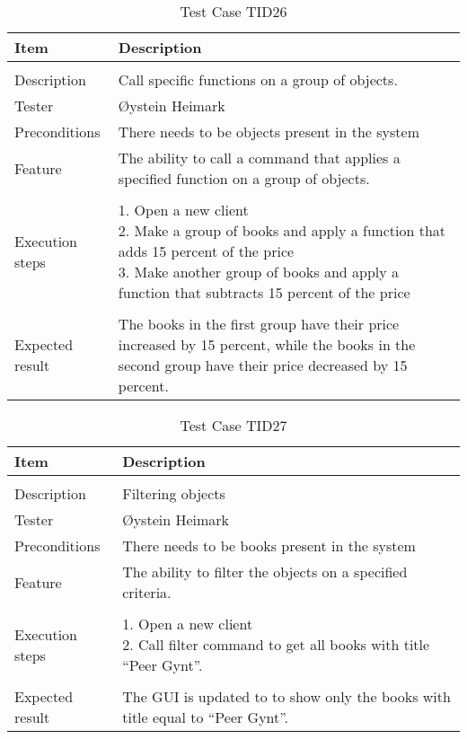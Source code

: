 \begin{table}[H]
\caption{Test Case TID26}
\centering
\begin{tabular}{ l p{13cm} }
\hline
 Item            & Description        \\
\hline \\ [-2.0ex]
 Description     &Call specific functions on a group of objects. \\
 Tester          & Øystein Heimark                  \\
 Preconditions   & There needs to be objects present in the system \\
 Feature         & The ability to call a command that applies a specified function on a group of objects.   \vspace{3pt}                     \\
\hline \\ [-1.5ex]
 Execution steps & \pbox{13cm}{1. Open a new client \\ 2. Make a group of books and apply a function that adds 15 percent of the price \\ 3. Make another group of books and apply a function that subtracts 15 percent of the price} \vspace{3pt} \\
\hline \\ [-1.5ex]
 Expected result & The books in the first group have their price increased by 15 percent, while the books in the second group have their price decreased by 15 percent. \\
\hline
\end{tabular}
\label{table:testcasetid26}
\end{table}


\begin{table}[H]
\caption{Test Case TID27}
\centering
\begin{tabular}{ l p{13cm} }
\hline
 Item            & Description        \\
\hline \\ [-2.0ex]
 Description     & Filtering objects \\
 Tester          & Øystein Heimark                  \\
 Preconditions   & There needs to be books present in the system\\
 Feature         & The ability to filter the objects on a specified criteria.   \vspace{3pt}                     \\
\hline \\ [-1.5ex]
 Execution steps & \pbox{13cm}{1. Open a new client \\ 2. Call filter command to get all books with title “Peer Gynt”. } \vspace{3pt} \\
\hline \\ [-1.5ex]
 Expected result & The GUI is updated to to show only the books with title equal to “Peer Gynt”. \\
\hline
\end{tabular}
\label{table:testcasetid27}
\end{table}


